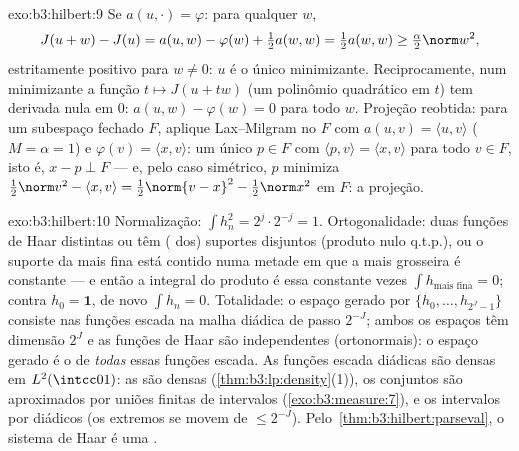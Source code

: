 \begin{solution}{exo:b3:hilbert:9}
Se $a(u, \cdot) = \varphi$: para qualquer $w$,
\[
J(u + w) - J(u) = a(u, w) - \varphi(w) + \tfrac12a(w,w)
= \tfrac12a(w,w) \geq \tfrac\alpha2\norm w^2,
\]
estritamente positivo para $w \neq 0$: $u$ é o único minimizante.
Reciprocamente, num minimizante a função $t \mapsto J(u + tw)$
(um polinômio quadrático em $t$) tem derivada nula em
$0$: $a(u, w) - \varphi(w) = 0$ para todo $w$. Projeção
reobtida: para um subespaço fechado $F$, aplique Lax--Milgram no
 $F$ com $a(u,v) = \langle u, v\rangle$
($M = \alpha = 1$) e $\varphi(v) = \langle x, v\rangle$: um
único $p \in F$ com $\langle p, v\rangle = \langle x,
v\rangle$ para todo $v \in F$, isto é, $x - p \perp F$ --- e, pelo
caso simétrico, $p$ minimiza $\frac12\norm v^2 - \langle
x, v\rangle = \frac12\norm{v - x}^2 - \frac12\norm x^2$ em
$F$: a projeção.
\end{solution}

\begin{solution}{exo:b3:hilbert:10}
Normalização: $\int h_n^2 = 2^j\cdot 2^{-j} = 1$.
Ortogonalidade: duas funções de Haar distintas ou têm
( dos) suportes disjuntos (produto nulo q.t.p.), ou o
suporte da mais fina está contido numa metade em que a
mais grosseira é constante --- e então a integral do produto é
essa constante vezes $\int h_{\text{mais fina}} = 0$; contra $h_0
= \mathbf 1$, de novo $\int h_n = 0$. Totalidade: o espaço gerado por
$\{h_0, \dots, h_{2^J-1}\}$ consiste nas funções escada na
malha diádica de passo $2^{-J}$; ambos os espaços têm dimensão
$2^J$ e as funções de Haar são independentes (ortonormais):
o espaço gerado é o de \emph{todas} essas funções escada. As funções escada
diádicas são densas em $L^2(\intcc01)$: as  são
densas (\cref{thm:b3:lp:density}(1)), os conjuntos  são
aproximados por uniões finitas de intervalos
(\cref{exo:b3:measure:7}), e os intervalos por diádicos (os
extremos se movem de $\leq 2^{-J}$). Pelo~\cref{thm:b3:hilbert:parseval}, o sistema de Haar é uma .
\end{solution}

